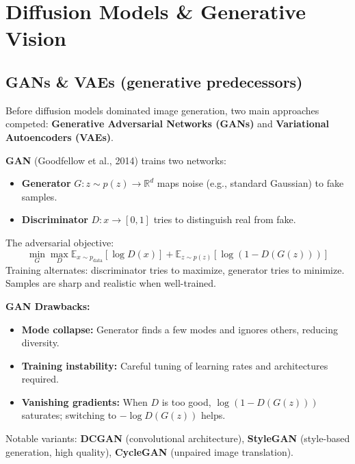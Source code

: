 
\section{Diffusion Models \& Generative Vision}

\subsection{GANs \& VAEs (generative predecessors)}

Before diffusion models dominated image generation, two main approaches competed: \textbf{Generative Adversarial Networks (GANs)} and \textbf{Variational Autoencoders (VAEs)}.

\begin{paperbox}[title={GAN: The Min-Max Game}]
\textbf{GAN} (Goodfellow et al., 2014) trains two networks:
\begin{itemize}
  \item \textbf{Generator} $G: z \sim p(z) \to \mathbb{R}^d$ maps noise (e.g., standard Gaussian) to fake samples.
  \item \textbf{Discriminator} $D: x \to [0,1]$ tries to distinguish real from fake.
\end{itemize}
The adversarial objective:
\[
\min_G \max_D \mathbb{E}_{x \sim p_\text{data}}[\log D(x)] + \mathbb{E}_{z \sim p(z)}[\log(1 - D(G(z)))]
\]
Training alternates: discriminator tries to maximize, generator tries to minimize. Samples are sharp and realistic when well-trained.

\begin{warnbox}
\textbf{GAN Drawbacks:}
\begin{itemize}
  \item \textbf{Mode collapse:} Generator finds a few modes and ignores others, reducing diversity.
  \item \textbf{Training instability:} Careful tuning of learning rates and architectures required.
  \item \textbf{Vanishing gradients:} When $D$ is too good, $\log(1-D(G(z)))$ saturates; switching to $-\log D(G(z))$ helps.
\end{itemize}
\end{warnbox}

Notable variants: \textbf{DCGAN} (convolutional architecture), \textbf{StyleGAN} (style-based generation, high quality), \textbf{CycleGAN} (unpaired image translation).
\end{paperbox}

